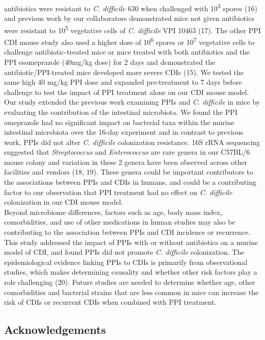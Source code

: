 \documentclass[11pt,]{article}
\begin{document}
antibiotics were resistant to \emph{C. difficile} 630 when challenged
with 10\textsuperscript{3} spores (16) and previous work by our
collaborators demonstrated mice not given antibiotics were resistant to
10\textsuperscript{5} vegetative cells of \emph{C. difficile } VPI 10463
(17). The other PPI CDI mouse study also used a higher dose of
10\textsuperscript{6} spores or 10\textsuperscript{7} vegetative cells
to challenge antibiotic-treated mice or mice treated with both
antibiotics and the PPI esomeprazole (40mg/kg dose) for 2 days and
demonstrated the antibiotic/PPI-treated mice developed more severe CDIs
(15). We tested the same high 40 mg/kg PPI dose and expanded
pre-treatment to 7 days before challenge to test the impact of PPI
treatment alone on our CDI mouse model.\\
Our study extended the previous work examining PPIs and \emph{C.
difficile} in mice by evaluating the contribution of the intestinal
microbiota. We found the PPI omeprazole had no significant impact on
bacterial taxa within the murine intestinal microbiota over the 16-day
experiment and in contrast to previous work, PPIs did not alter \emph{C.
difficile} colonization resistance. 16S rRNA sequencing suggested that
\emph{Streptococcus} and \emph{Enterococcus} are rare genera in our
C57BL/6 mouse colony and variation in these 2 genera have been observed
across other facilities and vendors (18, 19). These genera could be
important contributors to the associations between PPIs and CDIs in
humans, and could be a contributing factor to our observation that PPI
treatment had no effect on \emph{C. difficile} colonization in our CDI
mouse model.\\
Beyond microbiome differences, factors such as age, body mass index,
comorbidities, and use of other medications in human studies may also be
contributing to the association between PPIs and CDI incidence or
recurrence. This study addressed the impact of PPIs with or without
antibiotics on a murine model of CDI, and found PPIs did not promote
\emph{C. difficile} colonization. The epidemiological evidence linking
PPIs to CDIs is primarily from observational studies, which makes
determining causality and whether other risk factors play a role
challenging (20). Future studies are needed to determine whether age,
other comorbidities and bacterial strains that are less common in mice
can increase the risk of CDIs or recurrent CDIs when combined with PPI
treatment.

\subsection{Acknowledgements}\label{acknowledgements}
\end{document}
